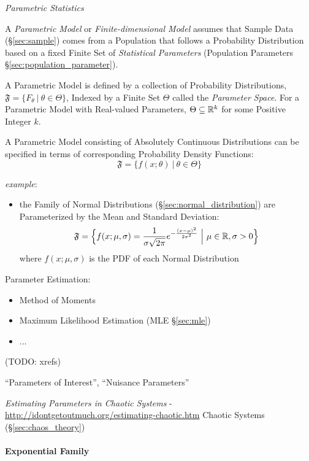 \emph{Parametric Statistics}

A \emph{Parametric Model} or \emph{Finite-dimensional Model} assumes that Sample
Data (\S\ref{sec:sample}) comes from a Population that follows a Probability
Distribution based on a fixed Finite Set of \emph{Statistical Parameters}
(Population Parameters \S\ref{sec:population_parameter}).

A Parametric Model is defined by a collection of Probability Distributions,
$\mathfrak{F} = \{ F_\theta \ |\ \theta \in \Theta \}$, Indexed by a Finite Set
$\Theta$ called the \emph{Parameter Space}. For a Parametric Model with
Real-valued Parameters, $\Theta \subseteq \mathbb{R}^k$ for some Positive Integer
$k$.

A Parametric Model consisting of Absolutely Continuous Distributions
can be specified in terms of corresponding Probability Density Functions:
\[
  \mathfrak{F} = \{ f(x; \theta) \ |\ \theta \in \Theta \}
\]

\emph{example}:
\begin{itemize}
  \item the Family of Normal Distributions (\S\ref{sec:normal_distribution}) are
    Parameterized by the Mean and Standard Deviation:
    \[
      \mathfrak{F} = \Big\{
        f(x; \mu, \sigma) =
          \frac{1}{\sigma\sqrt{2\pi}}e^{-\frac{(x-\mu)^2}{2\sigma^2}}
        \ \Big|\ \mu \in \mathbb{R}, \sigma > 0
      \Big\}
    \]
    where $f(x; \mu, \sigma)$ is the PDF of each Normal Distribution
\end{itemize}

Parameter Estimation:
\begin{itemize}
  \item Method of Moments
  \item Maximum Likelihood Estimation (MLE \S\ref{sec:mle})
  \item ...
\end{itemize}
(TODO: xrefs)

``Parameters of Interest'', ``Nuisance Parameters''

\emph{Estimating Parameters in Chaotic Systems} -
\url{http://idontgetoutmuch.org/estimating-chaotic.htm} \fist Chaotic Systems
(\S\ref{sec:chaos_theory})



\paragraph{Exponential Family}\label{sec:exponential_family}\hfill

